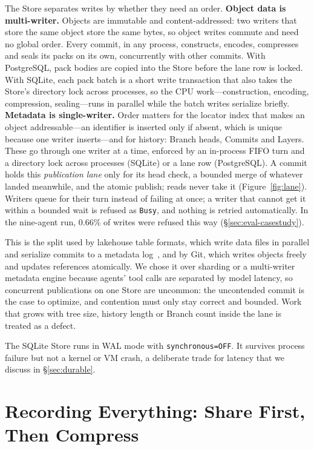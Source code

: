\documentclass[letterpaper,twocolumn,10pt]{article}
\begin{document}
The Store separates writes by whether they need an order.
\textbf{Object data is multi-writer.} Objects are immutable and
content-addressed: two writers that store the same object store the same
bytes, so object writes commute and need no global order. Every commit, in
any process, constructs, encodes, compresses and seals its packs on its own,
concurrently with other commits. With PostgreSQL, pack bodies are copied
into the Store before the lane row is locked. With SQLite, each pack batch
is a short write transaction that also takes the Store's directory lock
across processes, so the CPU work---construction, encoding, compression,
sealing---runs in parallel while the batch writes serialize briefly.
\textbf{Metadata is single-writer.} Order matters for the locator index
that makes an object addressable---an identifier is inserted only if
absent, which is unique because one writer inserts---and for history:
Branch heads, Commits and Layers. These go through one writer at a time,
enforced by an in-process FIFO turn and a directory lock across processes
(SQLite) or a lane row (PostgreSQL). A commit holds this \emph{publication
lane} only for its head check, a bounded merge of whatever landed meanwhile,
and the atomic publish; reads never take it (Figure~\ref{fig:lane}).
Writers queue for their turn
instead of failing at once; a writer that cannot get it within a bounded wait
is refused as \texttt{Busy}, and nothing is retried automatically. In the
nine-agent run, 0.66\% of writes were refused this way
(\S\ref{sec:eval-casestudy}).

This is the split used by lakehouse table formats, which write data files
in parallel and serialize commits to a metadata log~\cite{deltalake}, and by
Git, which writes objects freely and updates references atomically. We chose
it over sharding or a multi-writer metadata engine because agents' tool
calls are separated by model latency, so concurrent publications on one
Store are uncommon: the uncontended commit is the case to optimize, and
contention must only stay correct and bounded. Work that grows with tree
size, history length or Branch count inside the lane is treated as a
defect.

The SQLite Store runs in WAL mode with \texttt{synchronous=OFF}. It survives
process failure but not a kernel or VM crash, a deliberate trade for
latency that we discuss in \S\ref{sec:durable}.

\section{Recording Everything: Share First, Then Compress}
\label{sec:storage}
\end{document}
